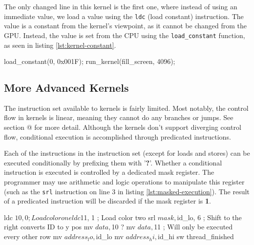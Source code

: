 \documentclass[../main/report.tex]{subfiles}
\begin{document}

The only changed line in this kernel is the first one,
where instead of using an immediate value, we load a value using the \verb/ldc/ (load constant) instruction.
The value is a constant from the kernel's viewpoint, as it cannot be changed from the GPU.
Instead, the value is set from the CPU using the \verb/load_constant/ function,
as seen in listing \ref{lst:kernel-constant}.

\begin{c-code}[caption=Now drawing a blue screen using parameters, label=lst:kernel-constant]
load_constant(0, 0x001F);
run_kernel(fill_screen, 4096);
\end{c-code}

\subsection{More Advanced Kernels}
The instruction set available to kernels is fairly limited.
Most notably, the control flow in kernels is linear, meaning they cannot do any branches or jumps. See section @ for more detail. 
Although the kernels don't support diverging control flow,
conditional execution is accomplished through predicated instructions.

Each of the instructions in the instruction set (except for loads and stores) can be executed conditionally by prefixing them with '\textbf{?}'.
Whether a conditional instruction is executed is controlled by a dedicated mask register.
The programmer may use arithmetic and logic operations to manipulate this register (such as the \verb/srl/ instruction on line 3 in listing \ref{lst:masked-execution}).
The result of a predicated instruction will be discarded if the mask register is \textbf{1}.

\begin{assembly}[caption=Conditional execution using predicated instructions, label=lst:masked-execution]
ldc $10, 0 ; Load color one
ldc $11, 1 ; Load color two
srl $mask, $id_lo, 6 ; Shift to the right converts ID to y pos
mv $data, $10 
? mv $data, $11 ; Will only be executed every other row
mv $address_lo, $id_lo
mv $address_hi, $id_hi
sw
thread_finished
\end{assembly}
\end{document}
